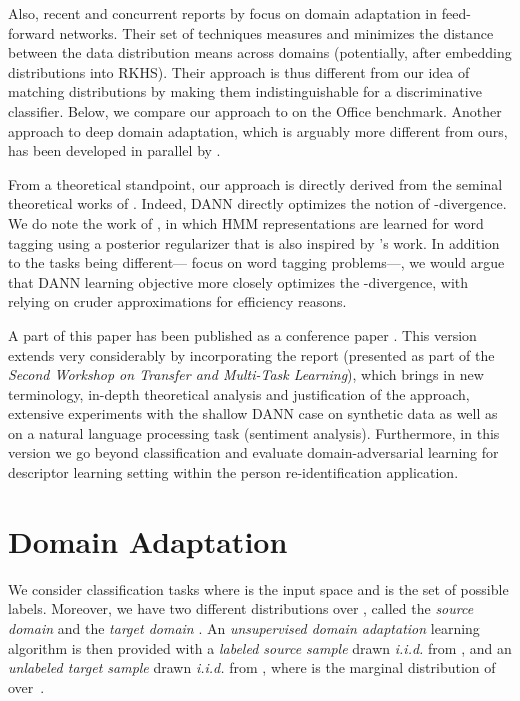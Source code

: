 \documentclass[twoside,11pt]{article}
\begin{document}
Also, recent and concurrent reports by \citet{Tzeng14,Long15} focus on domain adaptation in feed-forward networks. Their set of techniques measures and minimizes the distance between the data distribution means across domains (potentially, after embedding distributions into RKHS). Their approach is thus different from our idea of matching distributions by making them indistinguishable for a discriminative classifier. Below, we compare our approach to \citet{Tzeng14,Long15} on the Office benchmark. Another approach to deep domain adaptation, which is arguably more different from ours, has been developed in parallel by \citet{Chen15}.

From a theoretical standpoint, our approach is directly derived from the seminal theoretical works of \citet{BenDavid-NIPS06,BenDavid-MLJ2010}. Indeed, DANN directly optimizes the notion of -divergence. We do note the work of \citet{HuangY12},
in which HMM representations are learned for word tagging using a posterior regularizer that
is also inspired by \citeauthor{BenDavid-MLJ2010}'s work. In addition to the tasks being different---\citet{HuangY12} focus on word tagging problems---, we would argue that DANN learning objective more closely optimizes
the -divergence, with \citet{HuangY12} relying on cruder approximations 
for efficiency reasons.

A part of this paper has been published as a conference paper \citep{moscow}. This version extends \citet{moscow} very considerably by incorporating the report \citet{quebec} (presented as part of the \textit{Second Workshop on Transfer and Multi-Task Learning}), which brings in new terminology, in-depth theoretical analysis and justification of the approach, extensive experiments with the shallow DANN case on synthetic data as well as on a natural language processing task (sentiment analysis). Furthermore, in this version we go beyond classification and evaluate domain-adversarial learning for descriptor learning setting within the person re-identification application. 

\section{Domain Adaptation}
\label{section:DA_theory}

We consider classification tasks where  is the input space and  is the set of  possible labels.
Moreover, we have two different distributions over , called the {\it source domain}  and the {\it target domain} .
An \emph{unsupervised domain adaptation} learning algorithm is then provided with a {\it labeled source sample}  drawn {\it i.i.d.} from , and an {\it unlabeled target sample}  drawn {\it i.i.d.} from , where  is the marginal distribution of  over~.
\end{document}
